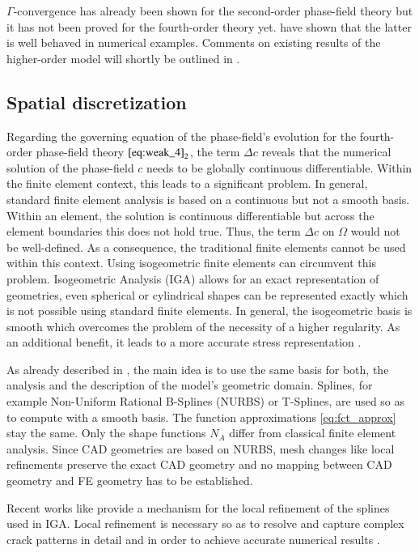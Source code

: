 $\Gamma$-convergence has already been shown for the second-order phase-field theory but it has not been proved for the fourth-order theory yet. \citet{02_PF_HO_brittle} have shown that the latter is well behaved in numerical examples. Comments on existing results of the higher-order model will shortly be outlined in .



\subsection{Spatial discretization} \label{sec:space_discr}
Regarding the governing equation of the phase-field's evolution for the fourth-order phase-field theory $\eqref{eq:weak_4}_{2}$, the term $\Delta c$ reveals that the numerical solution of the phase-field $c$ needs to be globally continuous differentiable. Within the finite element context, this leads to a significant problem. In general, standard finite element analysis is based on a continuous but not a smooth basis. Within an element, the solution is continuous differentiable but across the element boundaries this does not hold true. Thus, the term $\Delta c$ on $\Omega$ would not be well-defined. As a consequence, the traditional finite elements cannot be used within this context. Using isogeometric finite elements can circumvent this problem. Isogeometric Analysis (IGA) allows for an exact representation of geometries, even spherical or cylindrical shapes can be represented exactly which is not possible using standard finite elements. In general, the isogeometric basis is smooth which overcomes the problem of the necessity of a higher regularity. As an additional benefit, it leads to a more accurate stress representation \cite{01_PF_dyn_brittle}.

As already described in , the main idea is to use the same basis for both, the analysis and the description of the model's geometric domain. Splines, for example Non-Uniform Rational B-Splines (NURBS) or T-Splines, are used so as to compute with a smooth basis. The function approximations \eqref{eq:fct_approx} stay the same. Only the shape functions $N_{A}$ differ from classical finite element analysis. Since CAD geometries are based on NURBS, mesh changes like local refinements preserve the exact CAD geometry and no mapping between CAD geometry and FE geometry has to be established. \citep{11_PF_DissBorden}

Recent works like \cite{17_IGA_LRNURBS} provide a mechanism for the local refinement of the splines used in IGA. Local refinement is necessary so as to resolve and capture complex crack patterns in detail and in order to achieve accurate numerical results \cite{01_PF_dyn_brittle}.


